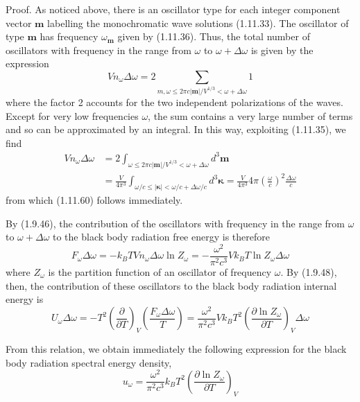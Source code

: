 \documentclass{article}
\begin{document}
Proof. As noticed above, there is an oscillator type for each integer component vector $\boldsymbol{m}$ labelling the monochromatic wave solutions (1.11.33). The oscillator of type $\boldsymbol{m}$ has frequency $\omega_{\boldsymbol{m}}$ given by (1.11.36). Thus, the total number of oscillators with frequency in the range from $\omega$ to $\omega+\Delta \omega$ is given by the expression
$$
\begin{equation*}
V n_{\omega} \Delta \omega=2 \sum_{m, \omega \leq 2 \pi c|\boldsymbol{m}| / V^{1 / 3}<\omega+\Delta \omega} 1 \tag{1.11.61}
\end{equation*}
$$
where the factor 2 accounts for the two independent polarizations of the waves. Except for very low frequencies $\omega$, the sum contains a very large number of terms and so can be approximated by an integral. In this way, exploiting (1.11.35), we find
$$
\begin{align*}
V n_{\omega} \Delta \omega & =2 \int_{\omega \leq 2 \pi c|\boldsymbol{m}| / V^{1 / 3}<\omega+\Delta \omega} d^{3} \boldsymbol{m}  \tag{1.11.62}\\
& =\frac{V}{4 \pi^{3}} \int_{\omega / c \leq|\boldsymbol{\kappa}|<\omega / c+\Delta \omega / c} d^{3} \boldsymbol{\kappa}=\frac{V}{4 \pi^{3}} 4 \pi\left(\frac{\omega}{c}\right)^{2} \frac{\Delta \omega}{c}
\end{align*}
$$
from which (1.11.60) follows immediately.

By (1.9.46), the contribution of the oscillators with frequency in the range
from $\omega$ to $\omega+\Delta \omega$ to the black body radiation free energy is therefore
$$
\begin{equation*}
F_{\omega} \Delta \omega=-k_{B} T V n_{\omega} \Delta \omega \ln Z_{\omega}=-\frac{\omega^{2}}{\pi^{2} c^{3}} V k_{B} T \ln Z_{\omega} \Delta \omega \tag{1.11.63}
\end{equation*}
$$
where $Z_{\omega}$ is the partition function of an oscillator of frequency $\omega$. By (1.9.48), then, the contribution of these oscillators to the black body radiation internal energy is
$$
\begin{equation*}
U_{\omega} \Delta \omega=-T^{2}\left(\frac{\partial}{\partial T}\right)_{V}\left(\frac{F_{\omega} \Delta \omega}{T}\right)=\frac{\omega^{2}}{\pi^{2} c^{3}} V k_{B} T^{2}\left(\frac{\partial \ln Z_{\omega}}{\partial T}\right)_{V} \Delta \omega \tag{1.11.64}
\end{equation*}
$$

From this relation, we obtain immediately the following expression for the black body radiation spectral energy density,
$$
\begin{equation*}
u_{\omega}=\frac{\omega^{2}}{\pi^{2} c^{3}} k_{B} T^{2}\left(\frac{\partial \ln Z_{\omega}}{\partial T}\right)_{V} \tag{1.11.65}
\end{equation*}
$$
\end{document}
